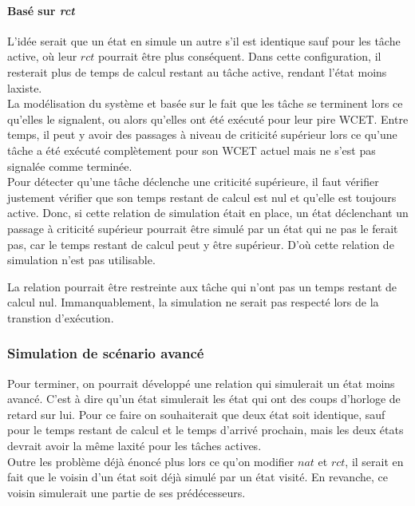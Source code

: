 \documentclass[12pt,a4paper,oneside]{book}
\theoremstyle{break}
\theoremstyle{breakplain}
\begin{document}
\paragraph{Basé sur \textit{rct}}

L'idée serait que un état en simule un autre s'il est identique sauf pour les tâche active, où leur $rct$ pourrait être plus conséquent. Dans cette configuration, il resterait plus de temps de calcul restant au tâche active, rendant l'état moins laxiste.\\

La modélisation du système et basée sur le fait que les tâche se terminent lors ce qu'elles le signalent, ou alors qu'elles ont été exécuté pour leur pire WCET. Entre temps, il peut y avoir des passages à niveau de criticité supérieur lors ce qu'une tâche a été exécuté complètement pour son WCET actuel mais ne s'est pas signalée comme terminée.\\
Pour détecter qu'une tâche déclenche une criticité supérieure, il faut vérifier justement vérifier que son temps restant de calcul est nul et qu'elle est toujours active. Donc, si cette relation de simulation était en place, un état déclenchant un passage à criticité supérieur pourrait être simulé par un état qui ne pas le ferait pas, car le temps restant de calcul peut y être supérieur. D'où cette relation de simulation n'est pas utilisable.

La relation pourrait être restreinte aux tâche qui n'ont pas un temps restant de calcul nul. Immanquablement, la simulation ne serait pas respecté lors de la transtion d'exécution. 


\subsubsection{Simulation de scénario avancé}

Pour terminer, on pourrait développé une relation qui simulerait un état moins avancé. C'est à dire qu'un état simulerait les état qui ont des coups d'horloge de retard sur lui. Pour ce faire on souhaiterait que deux état soit identique, sauf pour le temps restant de calcul et le temps d'arrivé prochain, mais les deux états devrait avoir la même laxité pour les tâches actives.\\
Outre les problème déjà énoncé plus lors ce qu'on modifier $nat$ et $rct$, il serait en fait que le voisin d'un état soit déjà simulé par un état visité. En revanche, ce voisin simulerait une partie de ses prédécesseurs.
\end{document}
